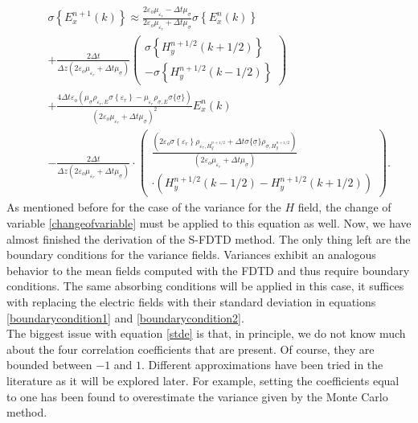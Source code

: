 \documentclass[12pt, oneside]{book}
\begin{document}
\begin{equation}\label{stde}
\begin{aligned}
&\sigma\left\{E_{x}^{n+1}(k)\right\} \approx \frac{2 \varepsilon_{o} \mu_{\varepsilon_{r}}-\Delta t \mu_{\underline{\sigma}}}{2 \varepsilon_{o} \mu_{\varepsilon_{r}}+\Delta t \mu_{\underline{\sigma}}} \sigma\left\{E_{x}^{n}(k)\right\} \\
&+\frac{2 \Delta t}{\Delta z\left(2 \varepsilon_{o} \mu_{\varepsilon_{r}}+\Delta t \mu_{\underline{\sigma}}\right)}\left(\begin{array}{c}
\sigma\left\{H_{y}^{n+1 / 2}(k+1 / 2)\right\} \\
-\sigma\left\{H_{y}^{n+1 / 2}(k-1 / 2)\right\}
\end{array}\right) \\
\quad & +\frac{4 \Delta t \varepsilon_{o}\left(\mu_{\underline{\sigma}} \rho_{\varepsilon_{r}, E} \sigma\left\{\varepsilon_{r}\right\}-\mu_{\varepsilon_{r}} \rho_{\underline{\sigma}, E} \sigma\{\underline{\sigma}\}\right)}{\left(2 \varepsilon_{o} \mu_{\varepsilon_{r}}+\Delta t \mu_{\underline{\sigma}}\right)^{2}} E_{x}^{n}(k) \\
&-\frac{2 \Delta t}{\Delta z\left(2 \varepsilon_{o} \mu_{\varepsilon_{r}}+\Delta t \mu_{\underline{\sigma}}\right)} 
\cdot\left(\begin{array}{c}
\frac{\left(2 \varepsilon_{o} \sigma\left\{\varepsilon_{r}\right\} \rho_{\varepsilon_{r}, H_{y}^{n+1 / 2}}+\Delta t \sigma\{\underline{\sigma}\} \rho_{\underline{\sigma}, H_{y}^{n+1 / 2}}\right)}{\left(2 \varepsilon_{o} \mu_{\varepsilon_{r}}+\Delta t \mu_{\underline{\sigma}}\right)} \\
\cdot \left(H_{y}^{n+1 / 2}(k-1 / 2)-H_{y}^{n+1 / 2}(k+1 / 2)\right)
\end{array}\right).
\end{aligned}
\end{equation}
\indent As mentioned before for the case of the variance for the $H$ field, the change of variable \ref{changeofvariable} must be applied to this equation as well. Now, we have almost finished the derivation of the S-FDTD method. The only thing left are the boundary conditions for the variance fields. Variances exhibit an analogous behavior to the mean fields computed with the FDTD and thus require boundary conditions. The same absorbing conditions will be applied in this case, it suffices with replacing the electric fields with their standard deviation in equations \ref{boundarycondition1} and \ref{boundarycondition2}. \\
\indent The biggest issue with equation \ref{stde} is that, in principle, we do not know much about the four correlation coefficients that are present. Of course, they are bounded between $-1$ and $1$. Different approximations have been tried in the literature as it will be explored later. For example, setting the coefficients equal to one has been found to overestimate the variance given  by the Monte Carlo method.
\end{document}
